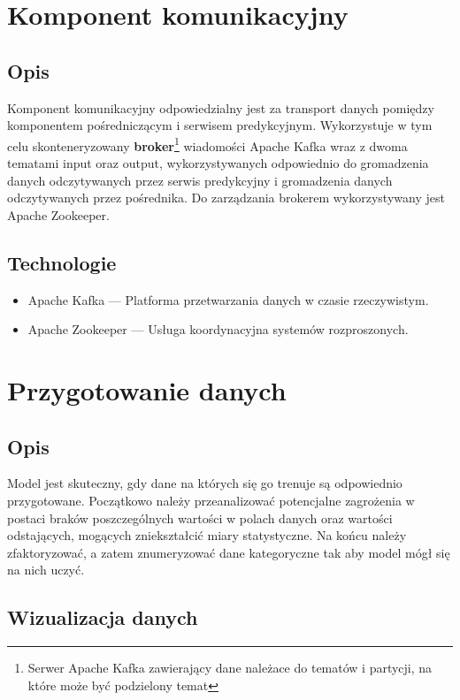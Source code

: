 \documentclass[12pt, a4paper]{report}
\begin{document}
\chapter{Komponent komunikacyjny}
\section{Opis}
Komponent komunikacyjny odpowiedzialny jest za transport danych pomiędzy komponentem pośredniczącym i serwisem predykcyjnym.
Wykorzystuje w tym celu skonteneryzowany \textbf{broker}\footnote{Serwer Apache Kafka zawierający dane należace do tematów i partycji, na które może być podzielony temat}
wiadomości Apache Kafka wraz z dwoma tematami input oraz output, wykorzystywanych
odpowiednio do gromadzenia danych odczytywanych przez serwis predykcyjny i gromadzenia danych odczytywanych przez pośrednika.
Do zarządzania brokerem wykorzystywany jest Apache Zookeeper.
\section{Technologie}
\begin{itemize}
    \item Apache Kafka --- Platforma przetwarzania danych w czasie rzeczywistym.
    \item Apache Zookeeper --- Usługa koordynacyjna systemów rozproszonych.
\end{itemize}

\chapter{Przygotowanie danych}
\section{Opis}
    Model jest skuteczny, gdy dane na których się go trenuje są odpowiednio przygotowane. Początkowo należy przeanalizować potencjalne zagrożenia w postaci braków poszczególnych wartości w polach danych oraz wartości odstających, mogących zniekształcić miary statystyczne. Na końcu należy zfaktoryzować, a zatem znumeryzować dane kategoryczne tak aby model mógł się na nich uczyć.

\section{Wizualizacja danych}
\end{document}
